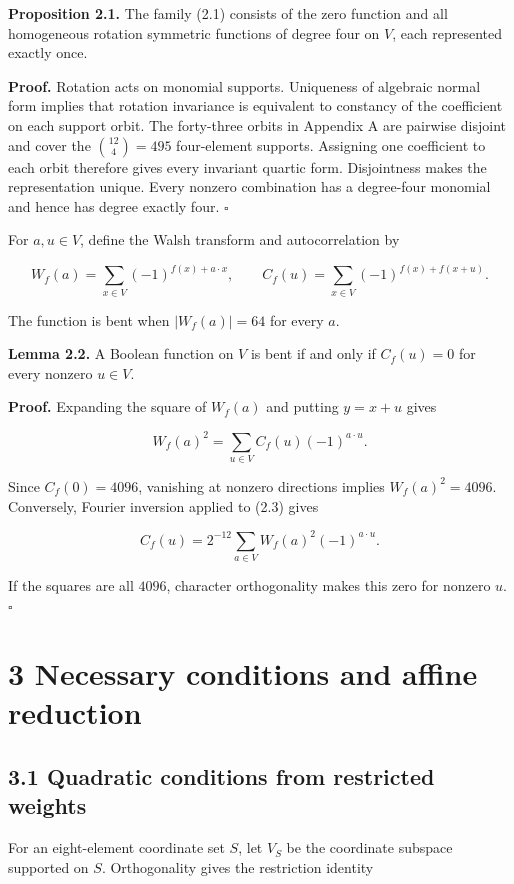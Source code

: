 \documentclass[11pt,a4paper]{article}
\begin{document}
\textbf{Proposition 2.1.} The family (2.1) consists of the zero function and all homogeneous rotation symmetric functions of degree four on $V$, each represented exactly once.

\textbf{Proof.} Rotation acts on monomial supports. Uniqueness of algebraic normal form implies that rotation invariance is equivalent to constancy of the coefficient on each support orbit. The forty-three orbits in Appendix A are pairwise disjoint and cover the $\binom{12}{4}=495$ four-element supports. Assigning one coefficient to each orbit therefore gives every invariant quartic form. Disjointness makes the representation unique. Every nonzero combination has a degree-four monomial and hence has degree exactly four. \hfill$\square$

For $a,u\in V$, define the Walsh transform and autocorrelation by

\[
W_f(a)=\sum_{x\in V}(-1)^{f(x)+a\cdot x},\qquad
C_f(u)=\sum_{x\in V}(-1)^{f(x)+f(x+u)}. \tag{2.2}
\]

The function is bent when $|W_f(a)|=64$ for every $a$.

\textbf{Lemma 2.2.} A Boolean function on $V$ is bent if and only if $C_f(u)=0$ for every nonzero $u\in V$.

\textbf{Proof.} Expanding the square of $W_f(a)$ and putting $y=x+u$ gives

\[
W_f(a)^2=\sum_{u\in V}C_f(u)(-1)^{a\cdot u}. \tag{2.3}
\]

Since $C_f(0)=4096$, vanishing at nonzero directions implies $W_f(a)^2=4096$. Conversely, Fourier inversion applied to (2.3) gives

\[
C_f(u)=2^{-12}\sum_{a\in V}W_f(a)^2(-1)^{a\cdot u}.
\]

If the squares are all $4096$, character orthogonality makes this zero for nonzero $u$. \hfill$\square$

\section*{3 Necessary conditions and affine reduction}

\subsection*{3.1 Quadratic conditions from restricted weights}

For an eight-element coordinate set $S$, let $V_S$ be the coordinate subspace supported on $S$. Orthogonality gives the restriction identity
\end{document}

